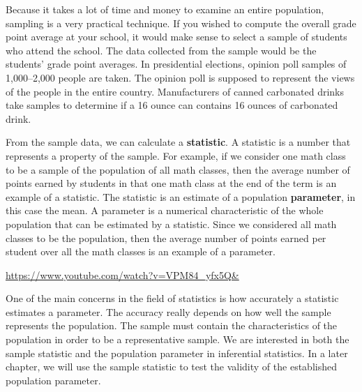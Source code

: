 \documentclass[
  letterpaper,
  DIV=11,
  numbers=noendperiod]{scrreprt}
\begin{document}
Because it takes a lot of time and money to examine an entire
population, sampling is a very practical technique. If you wished to
compute the overall grade point average at your school, it would make
sense to select a sample of students who attend the school. The data
collected from the sample would be the students' grade point averages.
In presidential elections, opinion poll samples of 1,000--2,000 people
are taken. The opinion poll is supposed to represent the views of the
people in the entire country. Manufacturers of canned carbonated drinks
take samples to determine if a 16 ounce can contains 16 ounces of
carbonated drink.

From the sample data, we can calculate a \textbf{statistic}. A statistic
is a number that represents a property of the sample. For example, if we
consider one math class to be a sample of the population of all math
classes, then the average number of points earned by students in that
one math class at the end of the term is an example of a statistic. The
statistic is an estimate of a population \textbf{parameter}, in this
case the mean. A parameter is a numerical characteristic of the whole
population that can be estimated by a statistic. Since we considered all
math classes to be the population, then the average number of points
earned per student over all the math classes is an example of a
parameter.

\url{https://www.youtube.com/watch?v=VPM84_yfx5Q&}

\begin{tcolorbox}[enhanced jigsaw, colframe=quarto-callout-tip-color-frame, bottomtitle=1mm, colbacktitle=quarto-callout-tip-color!10!white, bottomrule=.15mm, toprule=.15mm, breakable, leftrule=.75mm, left=2mm, rightrule=.15mm, colback=white, opacityback=0, opacitybacktitle=0.6, toptitle=1mm, titlerule=0mm, title=\textcolor{quarto-callout-tip-color}{\faLightbulb}\hspace{0.5em}{Is statistics accurate?}, arc=.35mm, coltitle=black]

One of the main concerns in the field of statistics is how accurately a
statistic estimates a parameter. The accuracy really depends on how well
the sample represents the population. The sample must contain the
characteristics of the population in order to be a representative
sample. We are interested in both the sample statistic and the
population parameter in inferential statistics. In a later chapter, we
will use the sample statistic to test the validity of the established
population parameter.

\end{tcolorbox}
\end{document}
